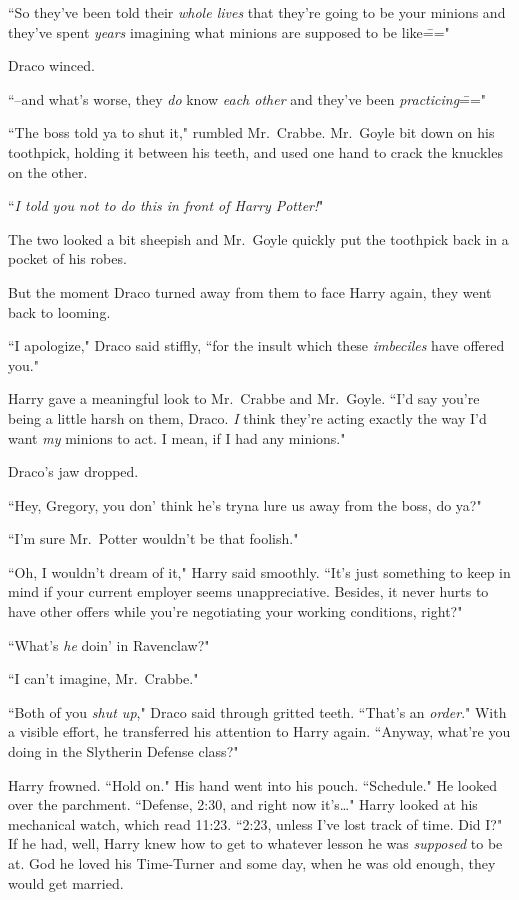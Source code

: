 ``So they've been told their \emph{whole lives} that they're going to be your minions and they've spent \emph{years} imagining what minions are supposed to be like\==="

Draco winced.

``\---and what's worse, they \emph{do} know \emph{each other} and they've been \emph{practicing}\==="

``The boss told ya to shut it," rumbled Mr.~Crabbe. Mr.~Goyle bit down on his toothpick, holding it between his teeth, and used one hand to crack the knuckles on the other.

``\emph{I told you not to do this in front of Harry Potter!}"

The two looked a bit sheepish and Mr.~Goyle quickly put the toothpick back in a pocket of his robes.

But the moment Draco turned away from them to face Harry again, they went back to looming.

``I apologize," Draco said stiffly, ``for the insult which these \emph{imbeciles} have offered you."

Harry gave a meaningful look to Mr.~Crabbe and Mr.~Goyle. ``I'd say you're being a little harsh on them, Draco. \emph{I} think they're acting exactly the way I'd want \emph{my} minions to act. I mean, if I had any minions."

Draco's jaw dropped.

``Hey, Gregory, you don' think he's tryna lure us away from the boss, do ya?"

``I'm sure Mr.~Potter wouldn't be that foolish."

``Oh, I wouldn't dream of it," Harry said smoothly. ``It's just something to keep in mind if your current employer seems unappreciative. Besides, it never hurts to have other offers while you're negotiating your working conditions, right?"

``What's \emph{he} doin' in Ravenclaw?"

``I can't imagine, Mr.~Crabbe."

``Both of you \emph{shut up}," Draco said through gritted teeth. ``That's an \emph{order}." With a visible effort, he transferred his attention to Harry again. ``Anyway, what're you doing in the Slytherin Defense class?"

Harry frowned. ``Hold on." His hand went into his pouch. ``Schedule." He looked over the parchment. ``Defense, 2:30\pm, and right now it's{\ldots}" Harry looked at his mechanical watch, which read 11:23. ``2:23, unless I've lost track of time. Did I?" If he had, well, Harry knew how to get to whatever lesson he was \emph{supposed} to be at. God he loved his Time-Turner and some day, when he was old enough, they would get married.


